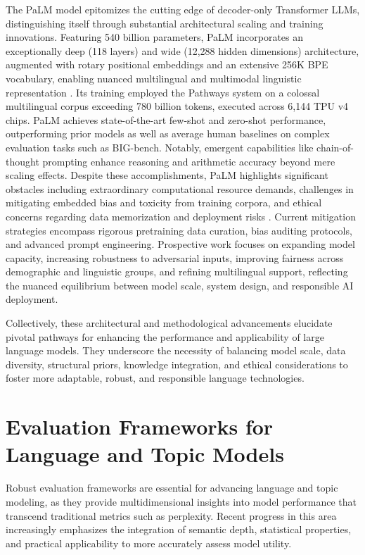 The PaLM model epitomizes the cutting edge of decoder-only Transformer LLMs, distinguishing itself through substantial architectural scaling and training innovations. Featuring 540 billion parameters, PaLM incorporates an exceptionally deep (118 layers) and wide (12,288 hidden dimensions) architecture, augmented with rotary positional embeddings and an extensive 256K BPE vocabulary, enabling nuanced multilingual and multimodal linguistic representation \cite{ref7}. Its training employed the Pathways system on a colossal multilingual corpus exceeding 780 billion tokens, executed across 6,144 TPU v4 chips. PaLM achieves state-of-the-art few-shot and zero-shot performance, outperforming prior models as well as average human baselines on complex evaluation tasks such as BIG-bench. Notably, emergent capabilities like chain-of-thought prompting enhance reasoning and arithmetic accuracy beyond mere scaling effects. Despite these accomplishments, PaLM highlights significant obstacles including extraordinary computational resource demands, challenges in mitigating embedded bias and toxicity from training corpora, and ethical concerns regarding data memorization and deployment risks \cite{ref7}. Current mitigation strategies encompass rigorous pretraining data curation, bias auditing protocols, and advanced prompt engineering. Prospective work focuses on expanding model capacity, increasing robustness to adversarial inputs, improving fairness across demographic and linguistic groups, and refining multilingual support, reflecting the nuanced equilibrium between model scale, system design, and responsible AI deployment.

Collectively, these architectural and methodological advancements elucidate pivotal pathways for enhancing the performance and applicability of large language models. They underscore the necessity of balancing model scale, data diversity, structural priors, knowledge integration, and ethical considerations to foster more adaptable, robust, and responsible language technologies.


\section{Evaluation Frameworks for Language and Topic Models}

Robust evaluation frameworks are essential for advancing language and topic modeling, as they provide multidimensional insights into model performance that transcend traditional metrics such as perplexity. Recent progress in this area increasingly emphasizes the integration of semantic depth, statistical properties, and practical applicability to more accurately assess model utility.

